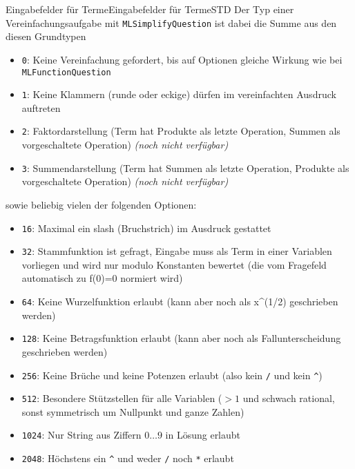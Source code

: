 \begin{MXContent}{Eingabefelder für Terme}{Eingabefelder für Terme}{STD}
Der Typ einer Vereinfachungsaufgabe mit \texttt{MLSimplifyQuestion} ist dabei die Summe aus den diesen Grundtypen
\ \\
\begin{itemize}
\item{\texttt{0}: Keine Vereinfachung gefordert, bis auf Optionen gleiche Wirkung wie bei \texttt{MLFunctionQuestion}}
\item{\texttt{1}: Keine Klammern (runde oder eckige) dürfen im vereinfachten Ausdruck auftreten}
\item{\texttt{2}: Faktordarstellung (Term hat Produkte als letzte Operation, Summen als vorgeschaltete Operation) \textit{(noch nicht verfügbar)}}
\item{\texttt{3}: Summendarstellung (Term hat Summen als letzte Operation, Produkte als vorgeschaltete Operation) \textit{(noch nicht verfügbar)}}
\end{itemize}
sowie beliebig vielen der folgenden Optionen:
\begin{itemize}
\item{\texttt{16}: Maximal ein slash (Bruchstrich) im Ausdruck gestattet}
\item{\texttt{32}: Stammfunktion ist gefragt, Eingabe muss als Term in einer Variablen vorliegen und wird nur modulo Konstanten bewertet (die vom Fragefeld automatisch zu f(0)=0 normiert wird)}
\item{\texttt{64}: Keine Wurzelfunktion erlaubt (kann aber noch als x\^{}(1/2) geschrieben werden)}
\item{\texttt{128}: Keine Betragsfunktion erlaubt (kann aber noch als Fallunterscheidung geschrieben werden)}
\item{\texttt{256}: Keine Brüche und keine Potenzen erlaubt (also kein \texttt{/} und kein \texttt{\^{}})}
\item{\texttt{512}: Besondere Stützstellen für alle Variablen ($>1$ und schwach rational, sonst symmetrisch um Nullpunkt und ganze Zahlen)}
\item{\texttt{1024}: Nur String aus Ziffern $0\ldots 9$ in Lösung erlaubt}
\item{\texttt{2048}: Höchstens ein \texttt{\^{}} und weder \texttt{/} noch \texttt{*} erlaubt}
\end{itemize}



\end{MXContent}
